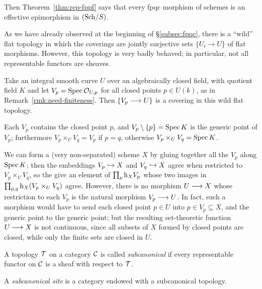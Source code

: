 \begin{2   CONTRAVARIANT FUNCTORS}
\begin{2.3 Sheaves in Grothendieck topologies}
Then Theorem~\ref{thm:rep-fppf} says that every fpqc morphism of schemes is an effective epimorphism in $({\mathrm{Sch}/S})$.

\begin{remark}\label{rmk:really-need-finiteness}
As we have already observed at the beginning of  \S\ref{subsec:fpqc}, there is a ``wild'' flat topology in which the coverings are  jointly surjective sets $\{U_i \to U\}$ of flat morphisms. However, this topology is very badly behaved; in particular, not all representable functors are sheaves.

Take an integral smooth curve $U$ over an algebraically closed field, with quotient field $K$ and let $V_p = \operatorname{Spec}\mathcal{O}_{U,p}$ for all closed points $p \in U(k)$, as in Remark~\ref{rmk:need-finiteness}. Then $\{V_p \arr U\}$ is a covering in this wild flat topology.

Each $V_p$ contains the closed point $p$, and $V_p \setminus \{p\} = \operatorname{Spec} K$ is the generic point of $V_p$; furthermore $V_p \times_U V_q = V_p$ if $p = q$, otherwise $V_p \times_U V_q = \operatorname{Spec} K$.

We can form a (very non-separated) scheme $X$ by gluing together all the $V_p$ along $\operatorname{Spec} K$; then the embeddings $V_p \hookrightarrow X$ and $V_q \hookrightarrow X$ agree when restricted to $V_p \times_U V_q$, so the give an element of $\prod_{p}\mathrm{h}_X V_p$ whose two images in $\prod_{p,q} \mathrm{h}_X(V_p \times_U V_q)$ agree. However, there is no morphism $U \arr X$ whose restriction to each $V_p$ is the natural morphism $V_p \arr U$. In fact, such a morphism would have to send each closed point $p \in U$ into $p \in V_p \subseteq X$, and the generic point to the generic point; but the resulting set-theoretic function $U \arr X$ is not continuous, since all subsets of $X$ formed by closed points are closed, while only the finite sets are closed in $U$.

\end{remark}

\begin{definition}\label{def:subcanonical}
A topology $\mathcal{T}$ on a category $\mathcal{C}$ is called \emph{subcanonical}%
%
 if every representable functor on $\mathcal{C}$ is a sheaf with respect to $\mathcal{T}$.

A \emph{subcanonical site}%
%
 is a category endowed with a subcanonical topology.
\end{definition}


\end{2.3 Sheaves in Grothendieck topologies}
\end{2   CONTRAVARIANT FUNCTORS}
